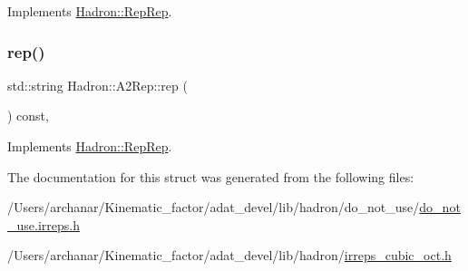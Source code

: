 Implements \mbox{\hyperlink{structHadron_1_1RepRep_ab3213025f6de249f7095892109575fde}{Hadron\+::\+Rep\+Rep}}.

\mbox{\label{structHadron_1_1A2Rep_a31e1135ddb204394f1c6153797a7dffa}} 
\subsubsection{\texorpdfstring{rep()}{rep()}\hspace{0.1cm}{\footnotesize\ttfamily [3/3]}}
{\footnotesize\ttfamily std\+::string Hadron\+::\+A2\+Rep\+::rep (\begin{DoxyParamCaption}{ }\end{DoxyParamCaption}) const\hspace{0.3cm}{\ttfamily [inline]}, {\ttfamily [virtual]}}



Implements \mbox{\hyperlink{structHadron_1_1RepRep_ab3213025f6de249f7095892109575fde}{Hadron\+::\+Rep\+Rep}}.



The documentation for this struct was generated from the following files\+:\begin{DoxyCompactItemize}
\item 
/\+Users/archanar/\+Kinematic\+\_\+factor/adat\+\_\+devel/lib/hadron/do\+\_\+not\+\_\+use/\mbox{\hyperlink{do__not__use_8irreps_8h}{do\+\_\+not\+\_\+use.\+irreps.\+h}}\item 
/\+Users/archanar/\+Kinematic\+\_\+factor/adat\+\_\+devel/lib/hadron/\mbox{\hyperlink{lib_2hadron_2irreps__cubic__oct_8h}{irreps\+\_\+cubic\+\_\+oct.\+h}}\end{DoxyCompactItemize}
